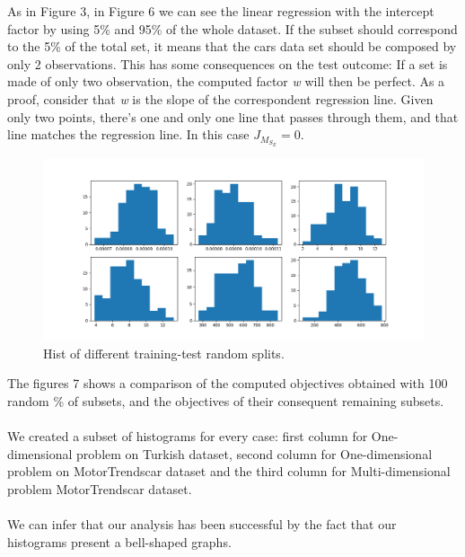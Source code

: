\documentclass[10pt]{article}
\begin{document}
As in Figure 3, in Figure 6 we can see the linear regression with the intercept factor by using 5\% and 95\% of the whole dataset. If the subset should correspond to the 5\% of the total set,
it means that the cars data set should be composed
by only 2 observations. This has some consequences on the
test outcome: If a set is made of only two observation, the
computed factor \textit{w} will then be perfect. As a proof, consider
that \textit{w} is the slope of the correspondent regression line. Given only two points, there’s one and only one line that passes
through them, and that line matches the regression line. In this case $J_M_S_E = 0$.


\begin{figure}[h] 
	\centering
	\includegraphics[width=1.0\columnwidth]{Figure_6.png} %
	\caption{Hist of different training-test random splits.}
\end{figure}

The figures 7 shows a comparison of the computed objectives obtained with 100 random \% of subsets, and the objectives of their consequent remaining subsets. \\\\We created a subset of histograms for every case: first column for One-dimensional problem on Turkish dataset, second column for One-dimensional problem on  MotorTrendscar dataset and the third column for Multi-dimensional problem MotorTrendscar dataset.
\\\\We can infer that our analysis has been successful by the fact that our histograms present a bell-shaped graphs.
\end{document}
